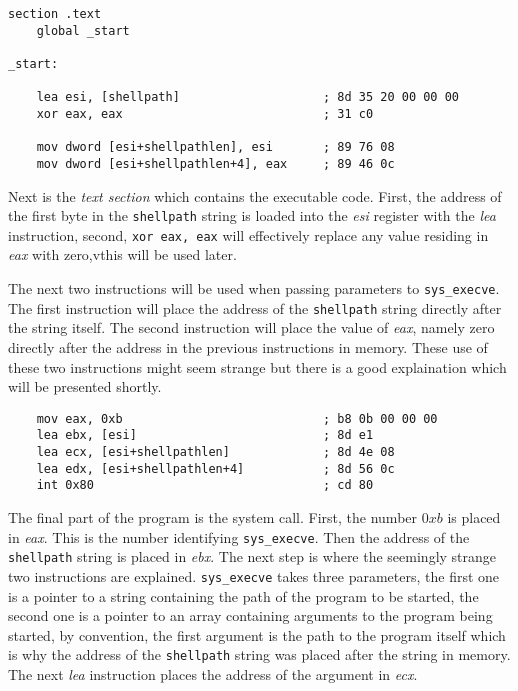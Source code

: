 \documentclass[11pt,twoside]{eitExjobb}
\begin{document}
\begin{verbatim}
section .text
    global _start

_start:

    lea esi, [shellpath]                    ; 8d 35 20 00 00 00
    xor eax, eax                            ; 31 c0

    mov dword [esi+shellpathlen], esi       ; 89 76 08
    mov dword [esi+shellpathlen+4], eax     ; 89 46 0c

\end{verbatim}

\noindent Next is the \emph{text section} which contains the executable code. First, the address of the first byte in the \texttt{shellpath} string is loaded into the \emph{esi} register with the \emph{lea} instruction, second, \texttt{xor eax, eax} will effectively replace any value residing in \emph{eax} with zero,vthis will be used later. 

The next two instructions will be used when passing parameters to \texttt{sys\_execve}. The first instruction will place the address of the \texttt{shellpath} string directly after the string itself. The second instruction will place the value of \emph{eax}, namely zero directly after the address in the previous instructions in memory. These use of these two instructions might seem strange but there is a good explaination which will be presented shortly.

\begin{verbatim}
    mov eax, 0xb                            ; b8 0b 00 00 00
    lea ebx, [esi]                          ; 8d e1
    lea ecx, [esi+shellpathlen]             ; 8d 4e 08
    lea edx, [esi+shellpathlen+4]           ; 8d 56 0c
    int 0x80                                ; cd 80
\end{verbatim}

\noindent The final part of the program is the system call. First, the number $0xb$ is placed in \emph{eax}. This is the number identifying \texttt{sys\_execve}. Then the address of the \texttt{shellpath} string is placed in \emph{ebx}. The next step is where the seemingly strange two instructions are explained. \texttt{sys\_execve} takes three parameters, the first one is a pointer to a string containing the path of the program to be started, the second one is a pointer to an array containing arguments to the program being started, by convention, the first argument is the path to the program itself which is why the address of the \texttt{shellpath} string was placed after the string in memory. The next \emph{lea} instruction places the address of the argument in \emph{ecx}. 
\end{document}
